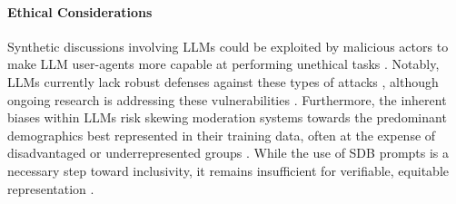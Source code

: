 %
\paragraph{Ethical Considerations} 
Synthetic discussions involving LLMs could be exploited by malicious actors to make LLM user-agents more capable at performing unethical tasks \cite{majumdar_2024_nefarious, MARULLI20245340}. Notably, LLMs currently lack robust defenses against these types of attacks \cite{li_2025_vulnerable}, although ongoing research is addressing these vulnerabilities \cite{wang_2025_risk}. Furthermore, the inherent biases within LLMs risk skewing moderation systems towards the predominant demographics best represented in their training data, often at the expense of disadvantaged or underrepresented groups \cite{rossi_2024, anthis_2025, burton2024large}. While the use of SDB prompts is a necessary step toward inclusivity, it remains insufficient for verifiable, equitable representation \cite{rossi_2024}.
